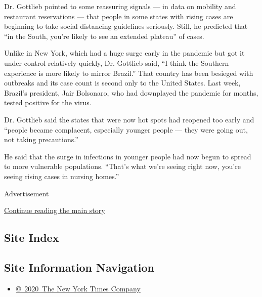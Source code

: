 Dr. Gottlieb pointed to some reassuring signals --- in data on mobility
and restaurant reservations --- that people in some states with rising
cases are beginning to take social distancing guidelines seriously.
Still, he predicted that ``in the South, you're likely to see an
extended plateau'' of cases.

Unlike in New York, which had a huge surge early in the pandemic but got
it under control relatively quickly, Dr. Gottlieb said, ``I think the
Southern experience is more likely to mirror Brazil.'' That country has
been besieged with outbreaks and its case count is second only to the
United States. Last week, Brazil's president, Jair Bolsonaro, who had
downplayed the pandemic for months, tested positive for the virus.

Dr. Gottlieb said the states that were now hot spots had reopened too
early and ``people became complacent, especially younger people --- they
were going out, not taking precautions.''

He said that the surge in infections in younger people had now begun to
spread to more vulnerable populations. ``That's what we're seeing right
now, you're seeing rising cases in nursing homes.''

Advertisement

\protect\hyperlink{after-bottom}{Continue reading the main story}

\hypertarget{site-index}{%
\subsection{Site Index}\label{site-index}}

\hypertarget{site-information-navigation}{%
\subsection{Site Information
Navigation}\label{site-information-navigation}}

\begin{itemize}
\tightlist
\item
  \href{https://help.nytimes.com/hc/en-us/articles/115014792127-Copyright-notice}{©~2020~The
  New York Times Company}
\end{itemize}

